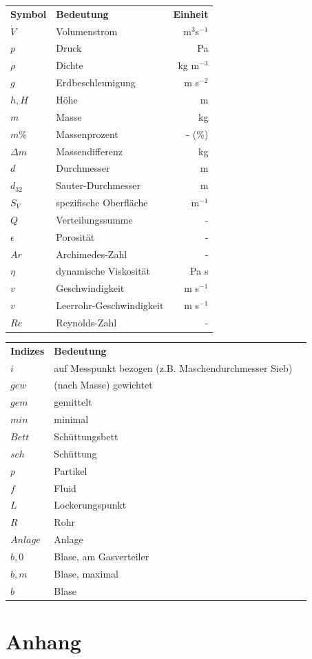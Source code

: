 \documentclass[12pt,liststotoc]{report}
\begin{document}
\begin{table}[H]
\renewcommand{\arraystretch}{1.5}
\setlength{\tabcolsep}{9mm}
\begin{tabular}{llr}
\textbf{Symbol} & \textbf{Bedeutung} & \textbf{Einheit}\\
$\dot{V}$ & Volumenstrom & m$^3$s$^{-1}$\\
$p$ & Druck & Pa\\
$\rho$ & Dichte & kg m$^{-3}$\\
$g$ & Erdbeschleunigung & m s$^{-2}$\\
$h, H$ & Höhe & m\\
$m$ & Masse & kg\\
$m\%$ & Massenprozent & - (\%)\\
$\Delta m$ & Massendifferenz & kg\\
$d$ & Durchmesser & m\\
$d_{32}$ & Sauter-Durchmesser & m\\
$S_V$ & spezifische Oberfläche & m$^{-1}$\\
$Q$ & Verteilungssumme & -\\
$\epsilon$ & Porosität & -\\
$Ar$ & Archimedes-Zahl & -\\
$\eta$ & dynamische Viskosität & Pa s\\
$v$ & Geschwindigkeit & m s$^{-1}$\\
$v$ & Leerrohr-Geschwindigkeit & m s$^{-1}$\\
$Re$ & Reynolds-Zahl & -\\
\end{tabular}
\end{table}

\begin{table}[H]
\renewcommand{\arraystretch}{1.5}
\setlength{\tabcolsep}{9mm}
\begin{tabular}{llr}
\textbf{Indizes} & \textbf{Bedeutung} &\\
$i$ & auf Messpunkt bezogen (z.B. Maschendurchmesser Sieb)\\
$gew$ & (nach Masse) gewichtet\\
$gem$ & gemittelt\\
$min$ & minimal\\
$Bett$ & Schüttungsbett\\
$sch$ & Schüttung\\
$p$ & Partikel\\
$f$ & Fluid\\
$L$ & Lockerungspunkt\\
$R$ & Rohr\\
$Anlage$ & Anlage\\
$b,0$ & Blase, am Gasverteiler\\
$b,m$ & Blase, maximal\\
$b$ & Blase\\
\end{tabular}
\end{table}

\newpage



\appendix
\chapter*{Anhang}
\end{document}

